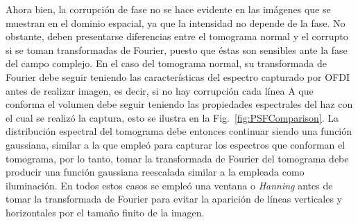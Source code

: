 Ahora bien, la corrupción de fase no se hace evidente en las imágenes que se muestran en el dominio espacial, ya que la intensidad no depende de la fase. No obstante, deben presentarse diferencias entre el tomograma normal y el corrupto si se toman transformadas de Fourier, puesto que éstas son sensibles ante la fase del campo complejo. En el caso del tomograma normal, su transformada de Fourier debe seguir teniendo las características del espectro capturado por OFDI antes de realizar imagen, es decir, si no hay corrupción cada línea A que conforma el volumen debe seguir teniendo las propiedades espectrales del haz con el cual se realizó la captura, esto se ilustra en la Fig.~\ref{fig:PSFComparison}. La distribución espectral del tomograma debe entonces continuar siendo una función gaussiana, similar a la que empleó para capturar los espectros que conforman el tomograma, por lo tanto, tomar la transformada de Fourier \enface del tomograma debe producir una función gaussiana reescalada similar a la empleada como iluminación. En todos estos casos se empleó una ventana  o \textit{Hanning} antes de tomar la transformada de Fourier para evitar la aparición de líneas verticales y horizontales por el tamaño finito de la imagen.


